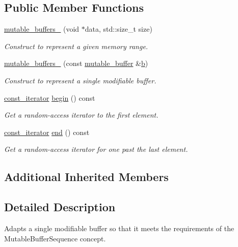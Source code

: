 \subsection*{Public Member Functions}
\begin{DoxyCompactItemize}
\item 
\hyperlink{classasio_1_1mutable__buffers__1_a1c56a78f3d2a5a16d29293ea04ce9ba4}{mutable\+\_\+buffers\+\_} (void $\ast$data, std\+::size\+\_\+t size)
\begin{DoxyCompactList}\small\item\em Construct to represent a given memory range. \end{DoxyCompactList}\item 
\hyperlink{classasio_1_1mutable__buffers__1_ac208ed5e1958c6937a287a19940e960d}{mutable\+\_\+buffers\+\_} (const \hyperlink{classasio_1_1mutable__buffer}{mutable\+\_\+buffer} \&\hyperlink{group__async__read_ga945a5c18fa77a9e2eba420f8f44b2a4f}{b})
\begin{DoxyCompactList}\small\item\em Construct to represent a single modifiable buffer. \end{DoxyCompactList}\item 
\hyperlink{classasio_1_1mutable__buffers__1_a50acb7cfb33b2e076062b79930452b51}{const\+\_\+iterator} \hyperlink{classasio_1_1mutable__buffers__1_a6352c8cf98df2808063bf2e8ffea68f8}{begin} () const 
\begin{DoxyCompactList}\small\item\em Get a random-\/access iterator to the first element. \end{DoxyCompactList}\item 
\hyperlink{classasio_1_1mutable__buffers__1_a50acb7cfb33b2e076062b79930452b51}{const\+\_\+iterator} \hyperlink{classasio_1_1mutable__buffers__1_ab3e0eb9085c474828650e901bc9f630a}{end} () const 
\begin{DoxyCompactList}\small\item\em Get a random-\/access iterator for one past the last element. \end{DoxyCompactList}\end{DoxyCompactItemize}
\subsection*{Additional Inherited Members}


\subsection{Detailed Description}
Adapts a single modifiable buffer so that it meets the requirements of the Mutable\+Buffer\+Sequence concept. 


